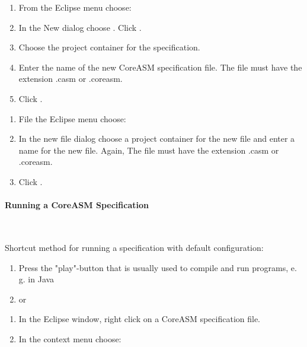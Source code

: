 \documentclass{article}
\newcommand{\CoreASM}{{\sffamily CoreASM}\xspace}
\begin{document}

\begin{enumerate}
	\item From the Eclipse menu choose: 
	\item In the New dialog choose . Click .
    \item Choose the project container for the specification.
    \item Enter the name of the new \CoreASM specification file. The file must have the extension {\ttfamily .casm} or {\ttfamily .coreasm}. 
	\item Click . 
\end{enumerate}


\begin{enumerate}
    \item File the Eclipse menu choose: 
    \item In the new file dialog choose a project container for the new file and enter a name for the new file. Again, The file must have the extension {\ttfamily .casm} or {\ttfamily .coreasm}.
    \item Click . 
\end{enumerate}

\paragraph{Running a \CoreASM Specification} ~


Shortcut method for running a specification with default configuration:

\begin{enumerate}
    \item Press the "play"-button that is usually used to compile and run programs, e.\,g. in Java
    \item[] or
    \vspace{-1em}
\end{enumerate}
\begin{enumerate}
    \item In the Eclipse window, right click on a \CoreASM specification file.
    \item In the context menu choose:  
\end{enumerate}
\end{document}
